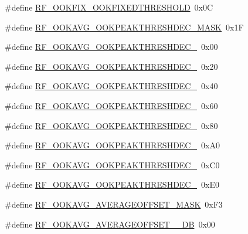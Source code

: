 \begin{DoxyCompactItemize}
\item 
\#define \mbox{\hyperlink{sx1276_regs-_fsk_8h_ad2bf54f789e69283ca0bf08d696bb721}{R\+F\+\_\+\+O\+O\+K\+F\+I\+X\+\_\+\+O\+O\+K\+F\+I\+X\+E\+D\+T\+H\+R\+E\+S\+H\+O\+LD}}~0x0C
\item 
\#define \mbox{\hyperlink{sx1276_regs-_fsk_8h_a2287adb3befe89936e5ed0572c501aa9}{R\+F\+\_\+\+O\+O\+K\+A\+V\+G\+\_\+\+O\+O\+K\+P\+E\+A\+K\+T\+H\+R\+E\+S\+H\+D\+E\+C\+\_\+\+M\+A\+SK}}~0x1F
\item 
\#define \mbox{\hyperlink{sx1276_regs-_fsk_8h_a6c9b34eb4954c700c6f4ba92809d3ffe}{R\+F\+\_\+\+O\+O\+K\+A\+V\+G\+\_\+\+O\+O\+K\+P\+E\+A\+K\+T\+H\+R\+E\+S\+H\+D\+E\+C\+\_}}~0x00
\item 
\#define \mbox{\hyperlink{sx1276_regs-_fsk_8h_aa67814a74e18aba2675aeb52d1ea7b8b}{R\+F\+\_\+\+O\+O\+K\+A\+V\+G\+\_\+\+O\+O\+K\+P\+E\+A\+K\+T\+H\+R\+E\+S\+H\+D\+E\+C\+\_}}~0x20
\item 
\#define \mbox{\hyperlink{sx1276_regs-_fsk_8h_a30ee5ddf6435cc05ce8552efcb7490bd}{R\+F\+\_\+\+O\+O\+K\+A\+V\+G\+\_\+\+O\+O\+K\+P\+E\+A\+K\+T\+H\+R\+E\+S\+H\+D\+E\+C\+\_}}~0x40
\item 
\#define \mbox{\hyperlink{sx1276_regs-_fsk_8h_aea7df55dec934090e2f1f9b6034cd7e9}{R\+F\+\_\+\+O\+O\+K\+A\+V\+G\+\_\+\+O\+O\+K\+P\+E\+A\+K\+T\+H\+R\+E\+S\+H\+D\+E\+C\+\_}}~0x60
\item 
\#define \mbox{\hyperlink{sx1276_regs-_fsk_8h_ad08d706304928ef15901203945928661}{R\+F\+\_\+\+O\+O\+K\+A\+V\+G\+\_\+\+O\+O\+K\+P\+E\+A\+K\+T\+H\+R\+E\+S\+H\+D\+E\+C\+\_}}~0x80
\item 
\#define \mbox{\hyperlink{sx1276_regs-_fsk_8h_a215d216886d5f06e59bd3c2b877f87c2}{R\+F\+\_\+\+O\+O\+K\+A\+V\+G\+\_\+\+O\+O\+K\+P\+E\+A\+K\+T\+H\+R\+E\+S\+H\+D\+E\+C\+\_}}~0x\+A0
\item 
\#define \mbox{\hyperlink{sx1276_regs-_fsk_8h_a05bf8d929b7d885f20888cc7f3332a8a}{R\+F\+\_\+\+O\+O\+K\+A\+V\+G\+\_\+\+O\+O\+K\+P\+E\+A\+K\+T\+H\+R\+E\+S\+H\+D\+E\+C\+\_}}~0x\+C0
\item 
\#define \mbox{\hyperlink{sx1276_regs-_fsk_8h_a3a072ae3ee56b50bf7de60f4469711df}{R\+F\+\_\+\+O\+O\+K\+A\+V\+G\+\_\+\+O\+O\+K\+P\+E\+A\+K\+T\+H\+R\+E\+S\+H\+D\+E\+C\+\_}}~0x\+E0
\item 
\#define \mbox{\hyperlink{sx1276_regs-_fsk_8h_ae287b34581e54ad15dfa43345e246722}{R\+F\+\_\+\+O\+O\+K\+A\+V\+G\+\_\+\+A\+V\+E\+R\+A\+G\+E\+O\+F\+F\+S\+E\+T\+\_\+\+M\+A\+SK}}~0x\+F3
\item 
\#define \mbox{\hyperlink{sx1276_regs-_fsk_8h_ab6d2934dbc04c61e6c03217796bfbde9}{R\+F\+\_\+\+O\+O\+K\+A\+V\+G\+\_\+\+A\+V\+E\+R\+A\+G\+E\+O\+F\+F\+S\+E\+T\+\_\+\_\+\+DB}}~0x00

\end{DoxyCompactItemize}
